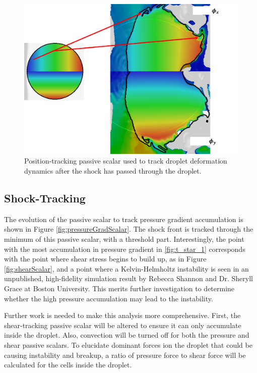 \documentclass{UCF_ETD}
\begin{document}
\begin{figure}[htp!]
\centering
\includegraphics[width=.5\textwidth]{Figures/secondaryDropPassiveScalar.png}
\caption{Position-tracking passive scalar used to track droplet deformation dynamics after the shock has passed through the droplet.}
\label{fig:secondaryDropResult}
\end{figure}

\subsection{Shock-Tracking}
\label{subsec:shockTrackingResults}

The evolution of the passive scalar to track pressure gradient accumulation is shown in Figure \ref{fig:pressureGradScalar}. The shock front is tracked through the minimum of this passive scalar, with a threshold part. Interestingly, the point with the most accumulation in pressure gradient in \ref{fig:t_star_1} corresponds with the point where shear stress begins to build up, as in Figure \ref{fig:shearScalar}, and a point where a Kelvin-Helmholtz instability is seen in an unpublished, high-fidelity simulation result by Rebecca Shannon and Dr. Sheryll Grace at Boston University. This merits further investigation to determine whether the high pressure accumulation may lead to the instability. 

Further work is needed to make this analysis more comprehensive. First, the shear-tracking passive scalar will be altered to ensure it can only accumulate inside the droplet. Also, convection will be turned off for both the pressure and shear passive scalars. To elucidate dominant forces ion the droplet that could be causing instability and breakup, a ratio of pressure force to shear force will be calculated for the cells inside the droplet.
\end{document}
